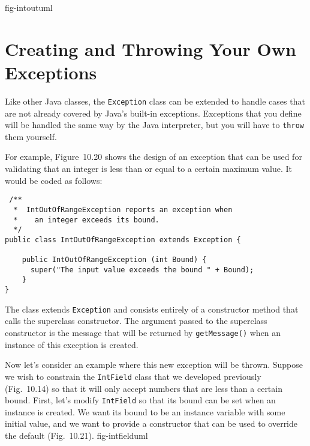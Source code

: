 {fig-intoutuml}

\section{Creating and Throwing Your Own \\ Exceptions}
\label{sec-throws}\label{pg-sec-throws}

\noindent Like other Java classes, the {\tt Exception} class can be extended to
handle cases that are not already covered by Java's built-in
exceptions.  Exceptions that you define will be handled the same way
by the Java interpreter, but you will have to {\tt throw} them
yourself.

For example, Figure~10.20 shows the design of an exception
that can be used for validating that an integer is less than or equal
to a certain maximum value. It would be coded as follows:

\begin{jjjlisting}
\begin{lstlisting}
 /**
  *  IntOutOfRangeException reports an exception when 
  *    an integer exceeds its bound.
  */
public class IntOutOfRangeException extends Exception {

    public IntOutOfRangeException (int Bound) {
      super("The input value exceeds the bound " + Bound);
    }
}
\end{lstlisting}
\end{jjjlisting}

\noindent The class extends {\tt Exception} and consists entirely of
a constructor method that calls the superclass constructor.
The argument passed to the superclass constructor is the message
that will be returned by {\tt getMessage()} when an instance of
this exception is created.


Now let's consider an example where this new exception will be
thrown.  Suppose we wish to constrain the {\tt IntField} class that we
developed previously (Fig.~10.14) so that it will only
accept numbers that are less than a certain bound.   First, let's
modify {\tt IntField} so that its bound can be set when an
instance is created. We want its bound to be an instance
variable with some initial value, and we want to provide a
constructor that can be used to override the default
(Fig.~10.21).  
{fig-intfielduml}


